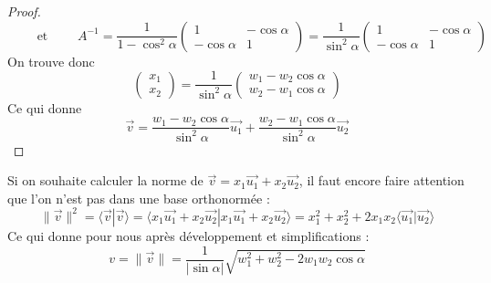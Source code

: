 \documentclass[class=report,crop=false]{standalone}
\newcommand{\vect}{\overrightarrow}
\begin{document}
\begin{proof}
$$\qquad\text{ et }\qquad 
A^{-1} = \frac{1}{1-\cos^2 \alpha}\begin{pmatrix}1&-\cos \alpha \\ -\cos \alpha & 1\end{pmatrix}
= \frac{1}{\sin^2 \alpha}\begin{pmatrix}1&-\cos \alpha \\ -\cos \alpha & 1\end{pmatrix} $$
On trouve donc
$$\begin{pmatrix}x_1\\x_2\end{pmatrix}
=\frac{1}{\sin^2 \alpha} 
\begin{pmatrix} w_1 - w_2 \cos\alpha  \\ w_2 -w_1 \cos \alpha \end{pmatrix}$$
Ce qui donne
$$\vect v = \frac{w_1 - w_2 \cos\alpha}{\sin^2\alpha} \vect{u_1} + 
 \frac{w_2 -w_1 \cos \alpha}{\sin^2\alpha} \vect{u_2}$$

\end{proof}


Si on souhaite calculer la norme de $\vect v = x_1 \vect{u_1} + x_2 \vect{u_2}$,
il faut encore faire attention que l'on n'est pas dans une base orthonormée :
$$ \| \vect v \|^2 = \langle \vect{v} | \vect{v} \rangle
= \langle x_1 \vect{u_1} + x_2 \vect{u_2} | x_1 \vect{u_1} + x_2 \vect{u_2} \rangle
= x_1^2 + x_2^2 + 2 x_1x_2 \langle \vect{u_1} | \vect{u_2} \rangle$$
Ce qui donne pour nous 
 après développement et simplifications :
$$v =  \| \vect v \|
= \frac{1}{|\sin\alpha|}\sqrt{w_1^2 + w_2^2 -2w_1w_2\cos\alpha}
$$
 
\end{document}
